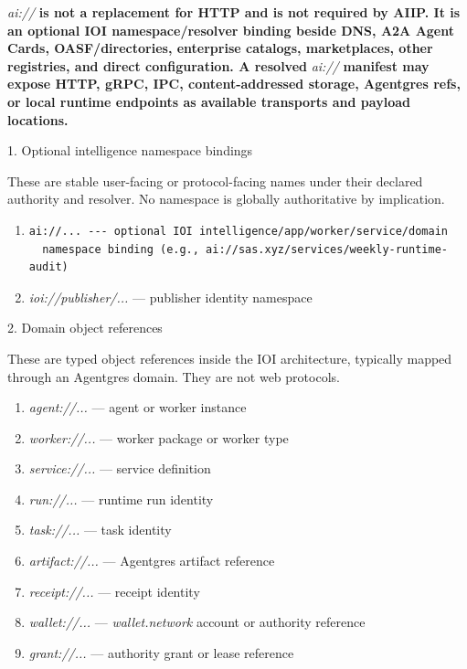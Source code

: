 \documentclass[
  11pt,
]{article}
\providecommand{\tightlist}{%
  \setlength{\itemsep}{0pt}\setlength{\parskip}{0pt}}
\begin{document}
\emph{ai://}\textbf{ is not a replacement for HTTP and is not required by
AIIP. It is an optional IOI namespace/resolver binding beside DNS, A2A Agent
Cards, OASF/directories, enterprise catalogs, marketplaces, other registries,
and direct configuration. A resolved }\emph{ai://}\textbf{ manifest may expose
HTTP, gRPC, IPC, content-addressed storage, Agentgres refs, or local runtime
endpoints as available transports and payload locations.}

1. Optional intelligence namespace bindings

These are stable user-facing or protocol-facing names under their declared
authority and resolver. No namespace is globally authoritative by implication.

\begin{enumerate}
\def\labelenumi{\arabic{enumi}.}
\tightlist
\item
\begin{lstlisting}[language=rustioi]
  ai://... --- optional IOI intelligence/app/worker/service/domain
  namespace binding (e.g., ai://sas.xyz/services/weekly-runtime-audit)
\end{lstlisting}
\item
  \emph{ioi://publisher/...} --- publisher identity namespace
\end{enumerate}

2. Domain object references

These are typed object references inside the IOI architecture, typically
mapped through an Agentgres domain. They are not web protocols.

\begin{enumerate}
\def\labelenumi{\arabic{enumi}.}
\tightlist
\item
  \emph{agent://...} --- agent or worker instance
\item
  \emph{worker://...} --- worker package or worker type
\item
  \emph{service://...} --- service definition
\item
  \emph{run://...} --- runtime run identity
\item
  \emph{task://...} --- task identity
\item
  \emph{artifact://...} --- Agentgres artifact reference
\item
  \emph{receipt://...} --- receipt identity
\item
  \emph{wallet://...} --- \emph{wallet.network} account or authority
  reference
\item
  \emph{grant://...} --- authority grant or lease reference
\end{enumerate}
\end{document}
